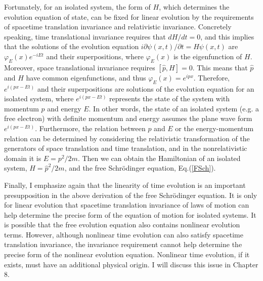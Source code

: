 Fortunately, for an isolated system, the form of $H$, which determines the evolution equation of state, can be fixed for linear evolution by the requirements of spacetime translation invariance and relativistic invariance. Concretely speaking, time translational invariance requires that $dH/dt=0$, and this implies that the solutions of the evolution equation $i{\partial \psi(x,t) / \partial t} =H\psi(x,t)$ are $\varphi_E(x)e^{-iEt}$ and their superpositions, where $\varphi_E(x)$ is the eigenfunction of $H$. Moreover, space translational invariance requires $[\hat{p},H]=0$. This means that $\hat{p}$ and $H$ have common eigenfunctions, and thus $\varphi_E(x)=e^{ipx}$. Therefore, $e^{i(px-Et)}$ and their superpositions are  solutions of the evolution equation for an isolated system, where $e^{i(px-Et)}$ represents the state of the system with  momentum $p$ and energy $E$. In other words, the state of an isolated system (e.g. a free electron) with definite momentum and energy assumes the plane wave form $e^{i(px-Et)}$. Furthermore, the relation between $p$ and $E$ or the energy-momentum relation can be determined by considering  the relativistic transformation of the generators of space translation and time translation, and in the nonrelativistic domain it is $E=p^2/2m$. Then we can obtain the Hamiltonian of an isolated system, $H=\hat{p}^2/2m$, and the free Schr\"{o}dinger equation, Eq.(\ref{FSch}). 

Finally, I emphasize again that the linearity of time evolution is an important presupposition in the above derivation of the free Schr\"{o}dinger equation. It is only for linear evolution that spacetime translation invariance of laws of motion can help determine the precise form of the equation of motion for isolated systems. It is possible that the free evolution equation also contains nonlinear evolution terms. However, although nonlinear time evolution can also satisfy spacetime translation invariance, the invariance requirement cannot help determine the precise form of the nonlinear evolution equation. Nonlinear time evolution, if it exists, must have an additional physical origin. I will discuss this issue in Chapter 8.

